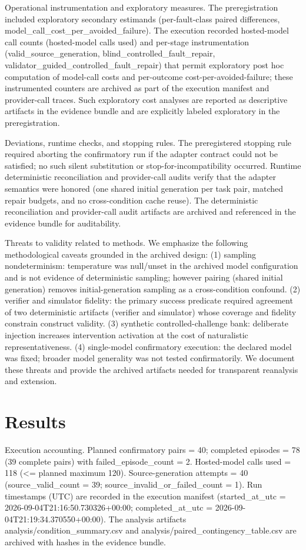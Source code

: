 \documentclass[conference]{IEEEtran}
\begin{document}
Operational instrumentation and exploratory measures. The preregistration included exploratory secondary estimands (per-fault-class paired differences, model\_call\_cost\_per\_avoided\_failure). The execution recorded hosted-model call counts (hosted-model calls used) and per-stage instrumentation (valid\_source\_generation, blind\_controlled\_fault\_repair, validator\_guided\_controlled\_fault\_repair) that permit exploratory post hoc computation of model-call costs and per-outcome cost-per-avoided-failure; these instrumented counters are archived as part of the execution manifest and provider-call traces. Such exploratory cost analyses are reported as descriptive artifacts in the evidence bundle and are explicitly labeled exploratory in the preregistration.

Deviations, runtime checks, and stopping rules. The preregistered stopping rule required aborting the confirmatory run if the adapter contract could not be satisfied; no such silent substitution or stop-for-incompatibility occurred. Runtime deterministic reconciliation and provider-call audits verify that the adapter semantics were honored (one shared initial generation per task pair, matched repair budgets, and no cross-condition cache reuse). The deterministic reconciliation and provider-call audit artifacts are archived and referenced in the evidence bundle for auditability.

Threats to validity related to methods. We emphasize the following methodological caveats grounded in the archived design: (1) sampling nondeterminism: temperature was null/unset in the archived model configuration and is not evidence of deterministic sampling; however pairing (shared initial generation) removes initial-generation sampling as a cross-condition confound. (2) verifier and simulator fidelity: the primary success predicate required agreement of two deterministic artifacts (verifier and simulator) whose coverage and fidelity constrain construct validity. (3) synthetic controlled-challenge bank: deliberate injection increases intervention activation at the cost of naturalistic representativeness. (4) single-model confirmatory execution: the declared model was fixed; broader model generality was not tested confirmatorily. We document these threats and provide the archived artifacts needed for transparent reanalysis and extension.

\section{Results}
Execution accounting. Planned confirmatory pairs = 40; completed episodes = 78 (39 complete pairs) with failed\_episode\_count = 2. Hosted-model calls used = 118 (<= planned maximum 120). Source-generation attempts = 40 (source\_valid\_count = 39; source\_invalid\_or\_failed\_count = 1). Run timestamps (UTC) are recorded in the execution manifest (started\_at\_utc = 2026-09-04T21:16:50.730326+00:00; completed\_at\_utc = 2026-09-04T21:19:34.370550+00:00). The analysis artifacts analysis/condition\_summary.csv and analysis/paired\_contingency\_table.csv are archived with hashes in the evidence bundle.
\end{document}
